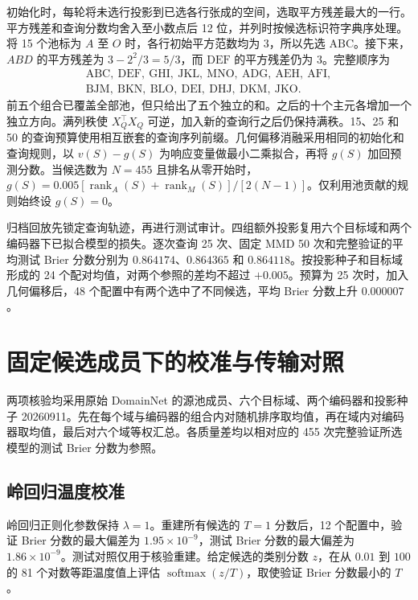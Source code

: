 \documentclass[UTF8,fontset=fandol,scheme=chinese,zihao=false,11pt,letterpaper]{ctexart}
\begin{document}
初始化时，每轮将未选行投影到已选各行张成的空间，选取平方残差最大的一行。平方残差和查询分数均舍入至小数点后 12 位，并列时按候选标识符字典序处理。将 15 个池标为 $A$ 至 $O$ 时，各行初始平方范数均为 $3$，所以先选 $\mathrm{ABC}$。接下来，$ABD$ 的平方残差为 $3-2^2/3=5/3$，而 $\mathrm{DEF}$ 的平方残差仍为 $3$。完整顺序为
\[
\begin{gathered}
 \mathrm{ABC,\ DEF,\ GHI,\ JKL,\ MNO,\ ADG,\ AEH,\ AFI,}\\
 \mathrm{BJM,\ BKN,\ BLO,\ DEI,\ DHJ,\ DKM,\ JKO}.
\end{gathered}
\]
前五个组合已覆盖全部池，但只给出了五个独立的和。之后的十个主元各增加一个独立方向。满列秩使 $X_Q^\top X_Q$ 可逆，加入新的查询行之后仍保持满秩。15、25 和 50 的查询预算使用相互嵌套的查询序列前缀。几何偏移消融采用相同的初始化和查询规则，以 $v(S)-g(S)$ 为响应变量做最小二乘拟合，再将 $g(S)$ 加回预测分数。当候选数为 $N=455$ 且排名从零开始时，$g(S)=0.005[\operatorname{rank}_A(S)+\operatorname{rank}_M(S)]/[2(N-1)]$。仅利用池贡献的规则始终设 $g(S)=0$。

归档回放先锁定查询轨迹，再进行测试审计。四组额外投影复用六个目标域和两个编码器下已拟合模型的损失。逐次查询 25 次、固定 MMD 50 次和完整验证的平均测试 Brier 分数分别为 $0.864174$、$0.864365$ 和 $0.864118$。按投影种子和目标域形成的 24 个配对均值，对两个参照的差均不超过 $+0.005$。预算为 25 次时，加入几何偏移后，48 个配置中有两个选中了不同候选，平均 Brier 分数上升 $0.000007$。

\section{固定候选成员下的校准与传输对照}
\label{app:calibration-transport}
两项核验均采用原始 DomainNet 的源池成员、六个目标域、两个编码器和投影种子 20260911。先在每个域与编码器的组合内对随机排序取均值，再在域内对编码器取均值，最后对六个域等权汇总。各质量差均以相对应的 455 次完整验证所选模型的测试 Brier 分数为参照。

\subsection{岭回归温度校准}
\label{app:ridge-temperature}
岭回归正则化参数保持 $\lambda=1$。重建所有候选的 $T=1$ 分数后，12 个配置中，验证 Brier 分数的最大偏差为 $1.95\times10^{-9}$，测试 Brier 分数的最大偏差为 $1.86\times10^{-9}$。测试对照仅用于核验重建。给定候选的类别分数 $z$，在从 $0.01$ 到 $100$ 的 81 个对数等距温度值上评估 $\operatorname{softmax}(z/T)$，取使验证 Brier 分数最小的 $T$。
\end{document}
